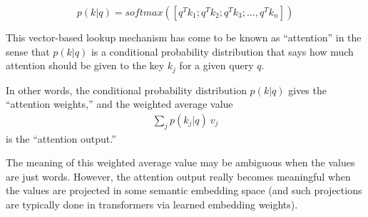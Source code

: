 \begin{equation*}
  p(k|q) ={softmax}\left(
  [q^T k_1; q^T k_2; q^T k_3; \dots, q^T k_n]
  \right)
\end{equation*}

This vector-based lookup mechanism has come to be known as ``attention'' in the sense that $p(k|q)$ is a conditional probability distribution that says how much attention should be given to the key $k_j$ for a given query $q$.







In other words, the conditional probability distribution $p(k | q)$ gives the ``attention weights,'' and the weighted average value
\begin{eqnarray}
  \sum_j p(k_j|q)\ v_j
\end{eqnarray}
is the ``attention output.''

The meaning of this weighted average value may be ambiguous when the values are just words.  However, the attention output really becomes meaningful when the values are projected in some semantic embedding space (and such projections are typically done in transformers via learned embedding weights).

